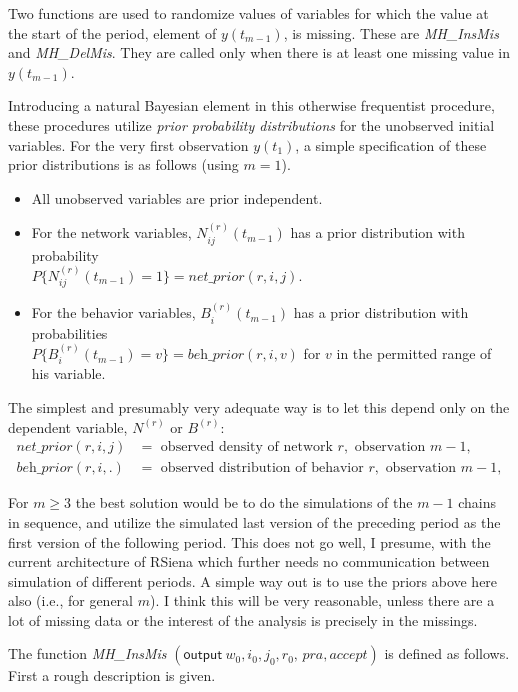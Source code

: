 \documentclass[a4paper,12pt,fleqn]{article}
\begin{document}
Two functions are used to randomize values of variables for which the
value at the start of the period, element of $y(t_{m-1})$,
is missing. These are \textit{MH\_InsMis} and \textit{MH\_DelMis}.
They are called only when there is at least
one missing value in $y(t_{m-1})$.

Introducing a natural Bayesian element in this otherwise frequentist
procedure, these procedures utilize \emph{prior probability distributions}
for the unobserved initial variables.
For the very first observation $y(t_1)$,
a simple specification of these prior distributions is as follows
(using $m=1$).
\begin{itemize}
\item All unobserved variables are prior independent.
\item[N.] For the network variables, $N_{ij}^{(r)}(t_{m-1})$
      has a prior distribution with probability\\
      $P\{N_{ij}^{(r)}(t_{m-1}) = 1\} = \textit{net\_prior}(r,i,j)$.
\item[B.] For the behavior variables, $B_{i}^{(r)}(t_{m-1})$
      has a prior distribution with probabilities\\
      $P\{B_{i}^{(r)}(t_{m-1}) = v\} = \textit{beh\_prior}(r,i,v)$
      for $v$ in the permitted range of his variable.
\end{itemize}
The simplest and presumably very adequate way is to let this depend
only on the dependent variable, $N^{(r)}$ or $B^{(r)}$:
\begin{align*}
 \textit{net\_prior}(r,i,j) &=
   \text{ observed density of network } r, \text{ observation } m-1, \\
 \textit{beh\_prior}(r,i,.) &=
   \text{ observed distribution of behavior } r, \text{ observation } m-1,
\end{align*}

For $m \geq 3$ the best solution would be to do the simulations of the $m-1$
chains in sequence, and utilize the simulated last version of the preceding
period as the first version of the following period.
This does not go well, I presume, with the current architecture
of RSiena which further
needs no communication between simulation of different periods.
A simple way out is to use the priors above here also
(i.e., for general $m$).
I think this will be very reasonable, unless there are a lot of
missing data or the interest of the analysis is precisely in the missings.

The function
\textit{MH\_InsMis}
$( \textsf{output}\  w_0,i_0,j_0,r_0,\, \textit{pra}, \textit{accept})$
is defined as follows.
First a rough description is given.
\end{document}
